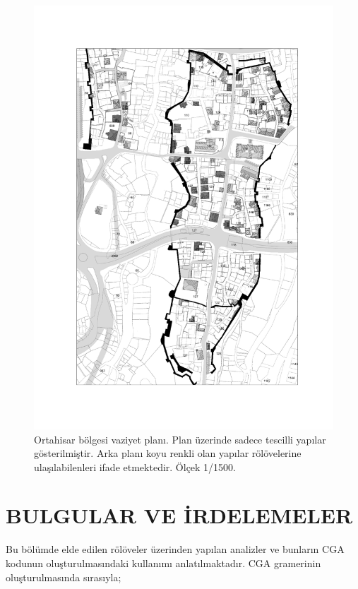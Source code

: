 \documentclass[12pt,turkish,a4paperpaper,]{report}
\begin{document}
\begin{figure}
\centering
\includegraphics[width=1\textwidth,height=\textheight]{source/figures/vaziyetplanitescilli.pdf}
\caption{Ortahisar bölgesi vaziyet planı. Plan üzerinde sadece tescilli
yapılar gösterilmiştir. Arka planı koyu renkli olan yapılar rölövelerine
ulaşılabilenleri ifade etmektedir. Ölçek 1/1500.}
\end{figure}

\hypertarget{bulgular-ve-irdelemeler}{%
\chapter{BULGULAR VE İRDELEMELER}\label{bulgular-ve-irdelemeler}}

\thispagestyle{empty}

Bu bölümde elde edilen rölöveler üzerinden yapılan analizler ve bunların
CGA kodunun oluşturulmasındaki kullanımı anlatılmaktadır. CGA gramerinin
oluşturulmasında sırasıyla;
\end{document}
